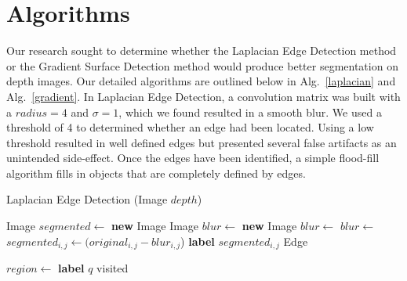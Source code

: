 
\section{Algorithms}
\label{sec:expts}

Our research sought to determine whether the Laplacian Edge Detection method or the Gradient Surface Detection method would produce better segmentation on depth images. Our detailed algorithms are outlined below in Alg.~\ref{laplacian} and Alg.~\ref{gradient}. In Laplacian Edge Detection, a convolution matrix was built with a $radius = 4$ and $\sigma = 1$, which we found resulted in a smooth blur. We used a threshold of 4 to determined whether an edge had been located. Using a low threshold resulted in well defined edges but presented several false artifacts as an unintended side-effect. Once the edges have been identified, a simple flood-fill algorithm fills in objects that are completely defined by edges.  

\begin{algorithm}
\caption{Laplacian Edge Detection (Image $depth$)}\label{laplacian}
\begin{algorithmic}[1]
\State Image $segmented \gets$ \textbf{new} Image
\State Image  $blur \gets$ \textbf{new} Image
\State $blur \gets $ 
\State $blur \gets $ 
\State $segmented_{i, j} \gets (original_{i, j}-blur_{i, j}$)
\State \textbf{label} $segmented_{i,j}$ Edge
\EndIf
\EndFor
\item[]
\State $region \gets$  
\State \textbf{label} $q$ visited
\EndFor
\EndIf
\EndFor
\State {}
\end{algorithmic}
\end{algorithm}

